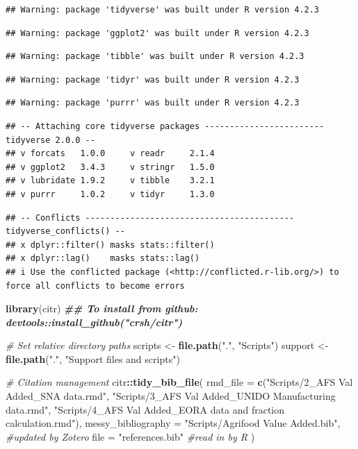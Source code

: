 \documentclass[
]{article}
\newenvironment{Shaded}{\begin{snugshade}}{\end{snugshade}}
\newcommand{\AttributeTok}[1]{\textcolor[rgb]{0.13,0.29,0.53}{#1}}
\newcommand{\CommentTok}[1]{\textcolor[rgb]{0.56,0.35,0.01}{\textit{#1}}}
\newcommand{\DocumentationTok}[1]{\textcolor[rgb]{0.56,0.35,0.01}{\textbf{\textit{#1}}}}
\newcommand{\FunctionTok}[1]{\textcolor[rgb]{0.13,0.29,0.53}{\textbf{#1}}}
\newcommand{\NormalTok}[1]{#1}
\newcommand{\OtherTok}[1]{\textcolor[rgb]{0.56,0.35,0.01}{#1}}
\newcommand{\SpecialCharTok}[1]{\textcolor[rgb]{0.81,0.36,0.00}{\textbf{#1}}}
\newcommand{\StringTok}[1]{\textcolor[rgb]{0.31,0.60,0.02}{#1}}
\begin{document}
\begin{verbatim}
## Warning: package 'tidyverse' was built under R version 4.2.3
\end{verbatim}

\begin{verbatim}
## Warning: package 'ggplot2' was built under R version 4.2.3
\end{verbatim}

\begin{verbatim}
## Warning: package 'tibble' was built under R version 4.2.3
\end{verbatim}

\begin{verbatim}
## Warning: package 'tidyr' was built under R version 4.2.3
\end{verbatim}

\begin{verbatim}
## Warning: package 'purrr' was built under R version 4.2.3
\end{verbatim}

\begin{verbatim}
## -- Attaching core tidyverse packages ------------------------ tidyverse 2.0.0 --
## v forcats   1.0.0     v readr     2.1.4
## v ggplot2   3.4.3     v stringr   1.5.0
## v lubridate 1.9.2     v tibble    3.2.1
## v purrr     1.0.2     v tidyr     1.3.0
\end{verbatim}

\begin{verbatim}
## -- Conflicts ------------------------------------------ tidyverse_conflicts() --
## x dplyr::filter() masks stats::filter()
## x dplyr::lag()    masks stats::lag()
## i Use the conflicted package (<http://conflicted.r-lib.org/>) to force all conflicts to become errors
\end{verbatim}

\begin{Shaded}
\begin{Highlighting}[]
\FunctionTok{library}\NormalTok{(citr) }\DocumentationTok{\#\# To install from github: devtools::install\_github("crsh/citr")}

\CommentTok{\# Set relative directory paths}
\NormalTok{  scripts }\OtherTok{\textless{}{-}} \FunctionTok{file.path}\NormalTok{(}\StringTok{"."}\NormalTok{, }\StringTok{"Scripts"}\NormalTok{)}
\NormalTok{  support }\OtherTok{\textless{}{-}} \FunctionTok{file.path}\NormalTok{(}\StringTok{"."}\NormalTok{, }\StringTok{"Support files and scripts"}\NormalTok{)}

\CommentTok{\# Citation management}
\NormalTok{citr}\SpecialCharTok{::}\FunctionTok{tidy\_bib\_file}\NormalTok{(}
  \AttributeTok{rmd\_file =} \FunctionTok{c}\NormalTok{(}\StringTok{"Scripts/2\_AFS Val Added\_SNA data.rmd"}\NormalTok{, }\StringTok{"Scripts/3\_AFS Val Added\_UNIDO Manufacturing data.rmd"}\NormalTok{,}
               \StringTok{"Scripts/4\_AFS Val Added\_EORA data and fraction calculation.rmd"}\NormalTok{),}
  \AttributeTok{messy\_bibliography =} \StringTok{"Scripts/Agrifood Value Added.bib"}\NormalTok{, }\CommentTok{\#updated by Zotero}
  \AttributeTok{file =} \StringTok{"references.bib"} \CommentTok{\#read in by R}
\NormalTok{)}
\end{Highlighting}
\end{Shaded}
\end{document}
